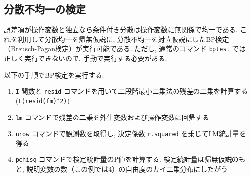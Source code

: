 \documentclass[
  letterpaper,
  xelatex,
  ja=standard, xelatex]{bxjsbook}
\newenvironment{Shaded}{\begin{snugshade}}{\end{snugshade}}
\newcommand{\AttributeTok}[1]{\textcolor[rgb]{0.40,0.45,0.13}{#1}}
\newcommand{\DecValTok}[1]{\textcolor[rgb]{0.68,0.00,0.00}{#1}}
\newcommand{\DocumentationTok}[1]{\textcolor[rgb]{0.37,0.37,0.37}{\textit{#1}}}
\newcommand{\FunctionTok}[1]{\textcolor[rgb]{0.28,0.35,0.67}{#1}}
\newcommand{\NormalTok}[1]{\textcolor[rgb]{0.00,0.23,0.31}{#1}}
\newcommand{\OtherTok}[1]{\textcolor[rgb]{0.00,0.23,0.31}{#1}}
\newcommand{\SpecialCharTok}[1]{\textcolor[rgb]{0.37,0.37,0.37}{#1}}
\providecommand{\tightlist}{%
  \setlength{\itemsep}{0pt}\setlength{\parskip}{0pt}}\usepackage{longtable,booktabs,array}
\begin{document}
\subsection{分散不均一の検定}\label{ux5206ux6563ux4e0dux5747ux4e00ux306eux691cux5b9a}

誤差項が操作変数と独立なら条件付き分散は操作変数に無関係で均一である.
これを利用して分散均一を帰無仮説に,
分散不均一を対立仮説にしたBP検定（Breusch-Pagan検定）が実行可能である.
ただし, 通常のコマンド \texttt{bptest} では正しく実行できないので,
手動で実行する必要がある.

以下の手順でBP検定を実行する:

\begin{enumerate}
\def\labelenumi{\arabic{enumi}.}
\tightlist
\item
  \texttt{I} 関数と \texttt{resid}
  コマンドを用いて二段階最小二乗法の残差の二乗を計算する
  (\texttt{I(resid(fm)\^{}2)})
\item
  \texttt{lm} コマンドで残差の二乗を外生変数および操作変数に回帰する
\item
  \texttt{nrow} コマンドで観測数を取得し, 決定係数 \texttt{r.squared}
  を乗じてLM統計量を得る
\item
  \texttt{pchisq} コマンドで検定統計量のP値を計算する.
  検定統計量は帰無仮説のもと,
  説明変数の数（この例では4）の自由度のカイ二乗分布にしたがう
\end{enumerate}

\begin{Shaded}
\end{Shaded}

\end{document}

